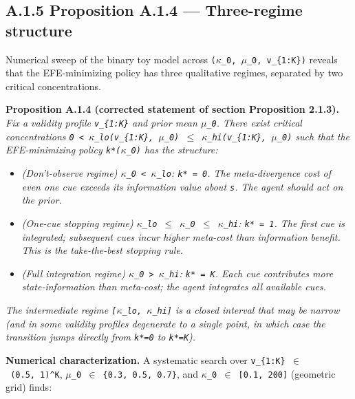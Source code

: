 \documentclass{article}
\providecommand{\tightlist}{\setlength{\itemsep}{0pt}\setlength{\parskip}{0pt}}
\begin{document}
\subsection{A.1.5 Proposition A.1.4 --- Three-regime
structure}\label{a.1.5-proposition-a.1.4-three-regime-structure}

Numerical sweep of the binary toy model across
\texttt{(\ensuremath{\kappa}\_0,\ \ensuremath{\mu}\_0,\ v\_\{1:K\})} reveals that the EFE-minimizing
policy has three qualitative regimes, separated by two critical
concentrations.

\textbf{Proposition A.1.4 (corrected statement of section Proposition
2.1.3).} \emph{Fix a validity profile \texttt{v\_\{1:K\}} and prior mean
\texttt{\ensuremath{\mu}\_0}. There exist critical concentrations
\texttt{0\ \textless{}\ \ensuremath{\kappa}\_lo(v\_\{1:K\},\ \ensuremath{\mu}\_0)\ \ensuremath{\leq}\ \ensuremath{\kappa}\_hi(v\_\{1:K\},\ \ensuremath{\mu}\_0)}
such that the EFE-minimizing policy \texttt{k*(\ensuremath{\kappa}\_0)} has the
structure:}

\begin{itemize}
\tightlist
\item
  \emph{(Don't-observe regime) \texttt{\ensuremath{\kappa}\_0\ \textless{}\ \ensuremath{\kappa}\_lo}:
  \texttt{k*\ =\ 0}. The meta-divergence cost of even one cue exceeds
  its information value about \texttt{s}. The agent should act on the
  prior.}
\item
  \emph{(One-cue stopping regime) \texttt{\ensuremath{\kappa}\_lo\ \ensuremath{\leq}\ \ensuremath{\kappa}\_0\ \ensuremath{\leq}\ \ensuremath{\kappa}\_hi}:
  \texttt{k*\ =\ 1}. The first cue is integrated; subsequent cues incur
  higher meta-cost than information benefit. This is the take-the-best
  stopping rule.}
\item
  \emph{(Full integration regime) \texttt{\ensuremath{\kappa}\_0\ \textgreater{}\ \ensuremath{\kappa}\_hi}:
  \texttt{k*\ =\ K}. Each cue contributes more state-information than
  meta-cost; the agent integrates all available cues.}
\end{itemize}

\emph{The intermediate regime \texttt{{[}\ensuremath{\kappa}\_lo,\ \ensuremath{\kappa}\_hi{]}} is a closed
interval that may be narrow (and in some validity profiles degenerate to
a single point, in which case the transition jumps directly from
\texttt{k*=0} to \texttt{k*=K}).}

\textbf{Numerical characterization.} A systematic search over
\texttt{v\_\{1:K\}\ \ensuremath{\in}\ (0.5,\ 1)\^{}K},
\texttt{\ensuremath{\mu}\_0\ \ensuremath{\in}\ \{0.3,\ 0.5,\ 0.7\}}, and
\texttt{\ensuremath{\kappa}\_0\ \ensuremath{\in}\ {[}0.1,\ 200{]}} (geometric grid) finds:
\end{document}
